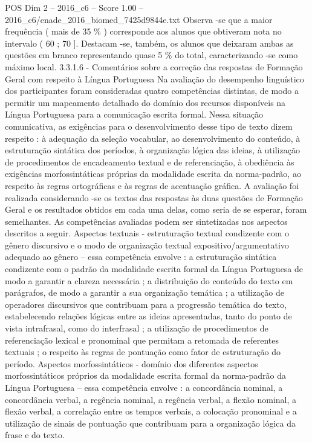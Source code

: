 \begin{textsample}{POS Dim 2 – 2016\_c6 – Score 1.00 – 2016\_c6/enade\_2016\_biomed\_7425d9844e.txt}
Observa -se que a maior frequência ( mais de 35 \% ) corresponde aos alunos que obtiveram nota no intervalo ( 60 ; 70 ].
Destacam -se, também, os alunos que deixaram ambas as questões em branco representando quase 5 \% do total, caracterizando -se como máximo local. 3.3.1.6 - Comentários sobre a correção das respostas de Formação Geral com respeito à Língua Portuguesa Na avaliação do desempenho linguístico dos participantes foram consideradas quatro competências distintas, de modo a permitir um mapeamento detalhado do domínio dos recursos disponíveis na Língua Portuguesa para a comunicação escrita formal.
Nessa situação comunicativa, as exigências para o desenvolvimento desse tipo de texto dizem respeito : à adequação da seleção vocabular, ao desenvolvimento do conteúdo, à estruturação sintática dos períodos, à organização lógica das ideias, à utilização de procedimentos de encadeamento textual e de referenciação, à obediência às exigências morfossintáticas próprias da modalidade escrita da norma-padrão, ao respeito às regras ortográficas e às regras de acentuação gráfica.
A avaliação foi realizada considerando -se os textos das respostas às duas questões de Formação Geral e os resultados obtidos em cada uma delas, como seria de se esperar, foram semelhantes.
As competências avaliadas podem ser sintetizadas nos aspectos descritos a seguir.
Aspectos textuais - estruturação textual condizente com o gênero discursivo e o modo de organização textual expositivo/argumentativo adequado ao gênero – essa competência envolve : a estruturação sintática condizente com o padrão da modalidade escrita formal da Língua Portuguesa de modo a garantir a clareza necessária ; a distribuição do conteúdo do texto em parágrafos, de modo a garantir a sua organização temática ; a utilização de operadores discursivos que contribuam para a progressão temática do texto, estabelecendo relações lógicas entre as ideias apresentadas, tanto do ponto de vista intrafrasal, como do interfrasal ; a utilização de procedimentos de referenciação lexical e pronominal que permitam a retomada de referentes textuais ; o respeito às regras de pontuação como fator de estruturação do período.
Aspectos morfossintáticos - domínio dos diferentes aspectos morfossintáticos próprios da modalidade escrita formal da norma-padrão da Língua Portuguesa – essa competência envolve : a concordância nominal, a concordância verbal, a regência nominal, a regência verbal, a flexão nominal, a flexão verbal, a correlação entre os tempos verbais, a colocação pronominal e a utilização de sinais de pontuação que contribuam para a organização lógica da frase e do texto.

\end{textsample}
